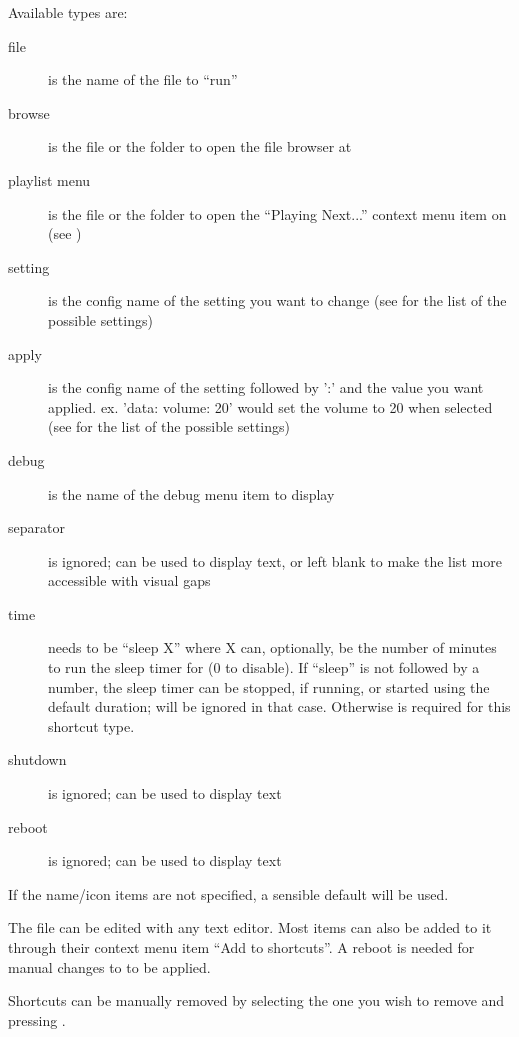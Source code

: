 Available types are:
\begin{description}
\item[file]  is the name of the file to ``run''
\item[browse]  is the file or the folder to open the file browser at
\item[playlist menu]  is the file or the folder to open the
  ``Playing Next...'' context menu item on (see )
\item[setting]  is the config name of the setting you want to change
  (see  for the list of the possible settings)
\item[apply]  is the config name of the setting followed by ':' 
  and the value you want applied. ex. 'data: volume: 20' would set the volume to 20 when selected
  (see  for the list of the possible settings)
\item[debug]  is the name of the debug menu item to display
\item[separator]  is ignored;  can be used to display text,
  or left blank to make the list more accessible with visual gaps
\item[time]  needs to be ``sleep X''
  where X can, optionally, be the number of minutes to run the sleep timer for (0 to disable).
  If ``sleep'' is not followed by a number, the sleep timer can be stopped, if running,
  or started using the default duration;  will be ignored in that case. Otherwise
   is required for this shortcut type.
\item[shutdown]  is ignored;  can be used to display text
\item[reboot]  is ignored;  can be used to display text
\end{description}

If the name/icon items are not specified, a sensible default will be used.


The file  can be edited with any text editor. Most items can
also be added to it through their context menu item ``Add to shortcuts''.
A reboot is needed for manual changes to  to be applied.

Shortcuts can be manually removed by selecting the one you wish to remove and pressing
\ActionStdContext{}.
